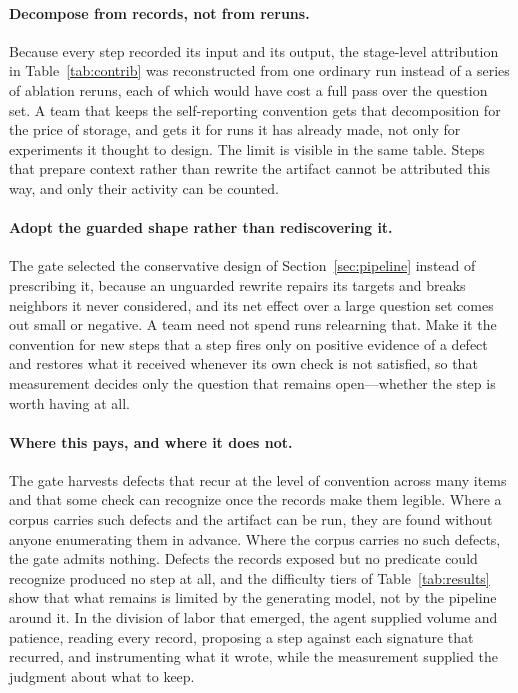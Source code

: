 \paragraph{Decompose from records, not from reruns.} Because every step
recorded its input and its output, the stage-level attribution in
Table~\ref{tab:contrib} was reconstructed from one ordinary run instead of a
series of ablation reruns, each of which would have cost a full pass over the
question set. A team that keeps the self-reporting convention gets that
decomposition for the price of storage, and gets it for runs it has already
made, not only for experiments it thought to design. The limit is
visible in the same table. Steps that prepare context rather than rewrite the
artifact cannot be attributed this way, and only their activity can be counted.

\paragraph{Adopt the guarded shape rather than rediscovering it.} The gate
selected the conservative design of Section~\ref{sec:pipeline} instead of
prescribing it, because an unguarded rewrite repairs its targets and breaks
neighbors it never considered, and its net effect over a large question set
comes out small or negative. A team need not spend runs relearning that. Make
it the convention for new steps that a step fires only on positive evidence of
a defect and restores what it received whenever its own check is not satisfied,
so that measurement decides only the question that remains open---whether the
step is worth having at all.

\paragraph{Where this pays, and where it does not.} The gate harvests defects
that recur at the level of convention across many items and that some check can
recognize once the records make them legible. Where a corpus carries such
defects and the artifact can be run, they are found without anyone enumerating
them in advance. Where the corpus carries no such defects, the gate admits
nothing.
Defects the records exposed but no predicate could recognize produced no step
at all, and the difficulty tiers of Table~\ref{tab:results} show that what
remains is limited by the generating model, not by the pipeline around it. In
the division of labor that emerged, the agent supplied volume and patience,
reading every record, proposing a step against each signature that recurred,
and instrumenting what it wrote, while the measurement supplied the judgment
about what to keep.
